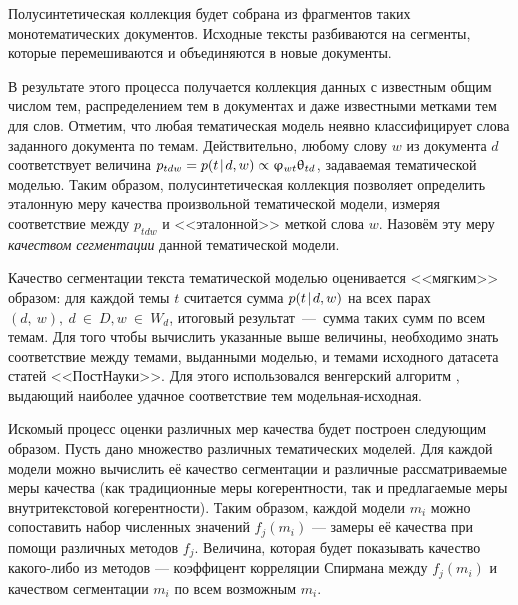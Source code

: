 Полусинтетическая коллекция будет собрана из фрагментов таких монотематических документов. Исходные тексты разбиваются на сегменты, которые перемешиваются и объединяются в новые документы.


В результате этого процесса получается коллекция данных с известным общим числом тем, распределением тем в документах и даже известными метками тем для слов. Отметим, что любая тематическая модель неявно классифицирует слова заданного документа по темам. Действительно, любому слову $w$ из документа $d$ соответствует величина $p_{tdw} = p(t \mspace{2mu}{|}\mspace{2mu} d, w) \propto \upvarphi_{wt}\uptheta_{td}$, задаваемая тематической моделью. Таким образом, полусинтетическая коллекция позволяет определить эталонную меру качества произвольной тематической модели, измеряя соответствие между $p_{tdw}$ и <<эталонной>> меткой слова $w$. Назовём эту меру \textit{качеством сегментации} данной тематической модели.

Качество сегментации текста тематической моделью оценивается <<мягким>> образом: для каждой темы $t$ считается сумма $p(t \mspace{2mu}{|}\mspace{2mu} d, w)$ на всех парах $(d,~w),\ d~\in~D, w~\in~W_d$, итоговый результат~---~сумма таких сумм по всем темам. Для того чтобы вычислить указанные выше величины, необходимо знать соответствие между темами, выданными моделью, и темами исходного датасета статей <<ПостНауки>>. Для этого использовался венгерский алгоритм \cite{kuhn1955hungarian}, выдающий наиболее удачное соответствие тем модельная-исходная.

Искомый процесс оценки различных мер качества будет построен следующим образом. Пусть дано множество различных тематических моделей. Для каждой модели можно вычислить её качество сегментации и различные рассматриваемые меры качества (как традиционные меры когерентности, так и предлагаемые меры внутритекстовой когерентности). Таким образом, каждой модели $m_i$ можно сопоставить набор численных значений $f_j(m_i)$ --- замеры её качества при помощи различных методов $f_j$. Величина, которая будет показывать качество какого-либо из методов --- коэффицент корреляции Спирмана между $f_j(m_i)$ и качеством сегментации $m_i$ по всем возможным $m_i$.

